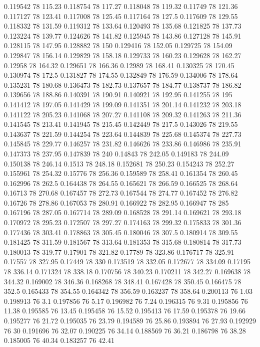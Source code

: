 0.119542 78 115.23
0.118754 78 117.27
0.118048 78 119.32
0.11749 78 121.36
0.117127 78 123.41
0.117008 78 125.45
0.117164 78 127.5
0.117609 78 129.55
0.118332 78 131.59
0.119312 78 133.64
0.120493 78 135.68
0.121825 78 137.73
0.123224 78 139.77
0.124626 78 141.82
0.125945 78 143.86
0.127128 78 145.91
0.128115 78 147.95
0.128882 78 150
0.129416 78 152.05
0.129725 78 154.09
0.129847 78 156.14
0.129829 78 158.18
0.129733 78 160.23
0.129628 78 162.27
0.12958 78 164.32
0.129651 78 166.36
0.12989 78 168.41
0.130325 78 170.45
0.130974 78 172.5
0.131827 78 174.55
0.132849 78 176.59
0.134006 78 178.64
0.135231 78 180.68
0.136473 78 182.73
0.137657 78 184.77
0.138737 78 186.82
0.139656 78 188.86
0.140391 78 190.91
0.140921 78 192.95
0.141255 78 195
0.141412 78 197.05
0.141429 78 199.09
0.141351 78 201.14
0.141232 78 203.18
0.141122 78 205.23
0.141068 78 207.27
0.141108 78 209.32
0.141263 78 211.36
0.141545 78 213.41
0.141945 78 215.45
0.142449 78 217.5
0.143026 78 219.55
0.143637 78 221.59
0.144254 78 223.64
0.144839 78 225.68
0.145374 78 227.73
0.145845 78 229.77
0.146257 78 231.82
0.146626 78 233.86
0.146986 78 235.91
0.147373 78 237.95
0.147839 78 240
0.14843 78 242.05
0.149183 78 244.09
0.150138 78 246.14
0.1513 78 248.18
0.152681 78 250.23
0.154243 78 252.27
0.155961 78 254.32
0.15776 78 256.36
0.159589 78 258.41
0.161354 78 260.45
0.162996 78 262.5
0.164438 78 264.55
0.165621 78 266.59
0.166525 78 268.64
0.16713 78 270.68
0.167457 78 272.73
0.167544 78 274.77
0.167452 78 276.82
0.16726 78 278.86
0.167053 78 280.91
0.166922 78 282.95
0.166947 78 285
0.167196 78 287.05
0.167714 78 289.09
0.168528 78 291.14
0.169621 78 293.18
0.170972 78 295.23
0.172507 78 297.27
0.174163 78 299.32
0.175833 78 301.36
0.177436 78 303.41
0.178863 78 305.45
0.180046 78 307.5
0.180914 78 309.55
0.181425 78 311.59
0.181567 78 313.64
0.181353 78 315.68
0.180814 78 317.73
0.180013 78 319.77
0.17901 78 321.82
0.17789 78 323.86
0.176717 78 325.91
0.17557 78 327.95
0.17449 78 330
0.173519 78 332.05
0.172677 78 334.09
0.17195 78 336.14
0.171324 78 338.18
0.170756 78 340.23
0.170211 78 342.27
0.169638 78 344.32
0.169002 78 346.36
0.168268 78 348.41
0.167428 78 350.45
0.166475 78 352.5
0.165433 78 354.55
0.164342 78 356.59
0.163237 78 358.64
0.200113 76 1.03
0.198913 76 3.1
0.197856 76 5.17
0.196982 76 7.24
0.196315 76 9.31
0.195856 76 11.38
0.195585 76 13.45
0.195458 76 15.52
0.195413 76 17.59
0.195378 76 19.66
0.195277 76 21.72
0.195035 76 23.79
0.194589 76 25.86
0.193894 76 27.93
0.192929 76 30
0.191696 76 32.07
0.190225 76 34.14
0.188569 76 36.21
0.186798 76 38.28
0.185005 76 40.34
0.183257 76 42.41
